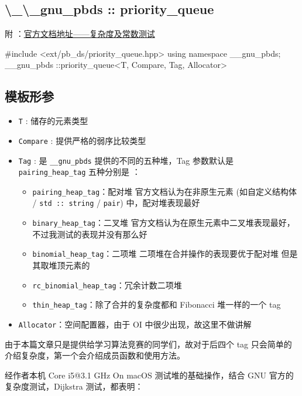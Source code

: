 
\subsection{\textbackslash{}\_\textbackslash{}\_gnu\_pbds :: priority\_queue}

附 ：\href{https://gcc.gnu.org/onlinedocs/libstdc++/ext/pb_ds/pq_performance_tests.html#std_mod1}{官方文档地址——复杂度及常数测试}

\begin{cppcode}
#include <ext/pb_ds/priority_queue.hpp>
using namespace __gnu_pbds;
__gnu_pbds ::priority_queue<T, Compare, Tag, Allocator>
\end{cppcode}

\subsection{模板形参}

\begin{itemize}
\item \texttt{T} : 储存的元素类型
\item \texttt{Compare} : 提供严格的弱序比较类型
\item \texttt{Tag} : 是 \texttt{__gnu_pbds} 提供的不同的五种堆，Tag 参数默认是 \texttt{pairing_heap_tag}
  五种分别是 ：
\begin{itemize}
\item \texttt{pairing_heap_tag}：配对堆
官方文档认为在非原生元素 (如自定义结构体 / \texttt{std :: string} / \texttt{pair}) 中，配对堆表现最好
\item \texttt{binary_heap_tag}：二叉堆 
官方文档认为在原生元素中二叉堆表现最好，不过我测试的表现并没有那么好
\item \texttt{binomial_heap_tag}：二项堆
二项堆在合并操作的表现要优于配对堆  但是其取堆顶元素的
\item \texttt{rc_binomial_heap_tag}：冗余计数二项堆
\item \texttt{thin_heap_tag}：除了合并的复杂度都和 Fibonacci 堆一样的一个 tag
\end{itemize}
\item \texttt{Allocator}：空间配置器，由于 OI 中很少出现，故这里不做讲解
\end{itemize}

由于本篇文章只是提供给学习算法竞赛的同学们，故对于后四个 tag 只会简单的介绍复杂度，第一个会介绍成员函数和使用方法。

经作者本机 Core i5@3.1 GHz On macOS 测试堆的基础操作，结合 GNU 官方的复杂度测试，Dijkstra 测试，都表明：

